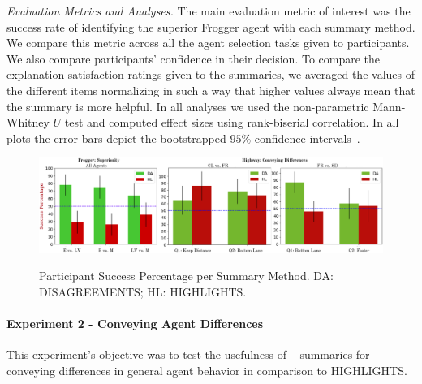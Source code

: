 \emph{Evaluation Metrics and Analyses.} 
The main evaluation metric of interest was the success rate of identifying the superior Frogger agent with each summary method. We compare this metric across all the agent selection tasks given to participants. We also compare participants’ confidence in their decision.
To compare the explanation satisfaction ratings given to the summaries, we
averaged the values of the different items normalizing in such a way that
higher values always mean that the summary is more helpful.
In all analyses we used the non-parametric Mann-Whitney $U$ test and computed
effect sizes using rank-biserial correlation. In all plots the error bars depict
the bootstrapped $95\%$ confidence intervals~\cite{efron1994introduction}. 


\begin{figure}[t]
	\centering
	\includegraphics[width=0.85\linewidth]{images/successes_three.png}\\
	\caption{Participant Success Percentage per Summary Method. DA: DISAGREEMENTS; HL: HIGHLIGHTS.}
	\label{fig: DA HL compare}
\end{figure}


\paragraph{Experiment 2 - Conveying Agent Differences}
This experiment's objective was to test the usefulness of \disalg~ summaries for conveying differences in general agent behavior in comparison to HIGHLIGHTS.


